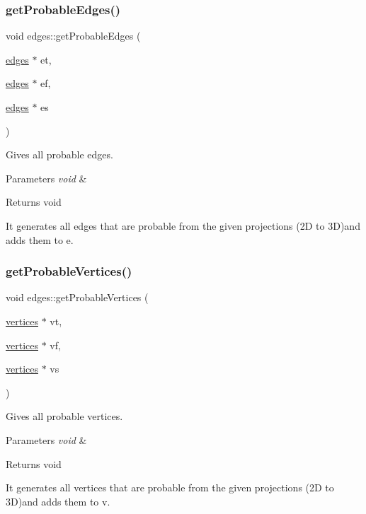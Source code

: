 \subsubsection{\texorpdfstring{get\+Probable\+Edges()}{getProbableEdges()}}
{\footnotesize\ttfamily void edges\+::get\+Probable\+Edges (\begin{DoxyParamCaption}\item[{\mbox{\hyperlink{classedges}{edges}} $\ast$}]{et,  }\item[{\mbox{\hyperlink{classedges}{edges}} $\ast$}]{ef,  }\item[{\mbox{\hyperlink{classedges}{edges}} $\ast$}]{es }\end{DoxyParamCaption})}



Gives all probable edges. 


\begin{DoxyParams}{Parameters}
{\em void} & \\
\hline
\end{DoxyParams}
\begin{DoxyReturn}{Returns}
void
\end{DoxyReturn}
It generates all edges that are probable from the given projections (2D to 3D)and adds them to e. \mbox{\label{classedges_a0feaa97509484a534614d92b6865d34b}} 
\subsubsection{\texorpdfstring{get\+Probable\+Vertices()}{getProbableVertices()}}
{\footnotesize\ttfamily void edges\+::get\+Probable\+Vertices (\begin{DoxyParamCaption}\item[{\mbox{\hyperlink{classvertices}{vertices}} $\ast$}]{vt,  }\item[{\mbox{\hyperlink{classvertices}{vertices}} $\ast$}]{vf,  }\item[{\mbox{\hyperlink{classvertices}{vertices}} $\ast$}]{vs }\end{DoxyParamCaption})}



Gives all probable vertices. 


\begin{DoxyParams}{Parameters}
{\em void} & \\
\hline
\end{DoxyParams}
\begin{DoxyReturn}{Returns}
void
\end{DoxyReturn}
It generates all vertices that are probable from the given projections (2D to 3D)and adds them to v. \mbox{\label{classedges_a134a326c5f08d0a256a978e6b8a51e85}} 
